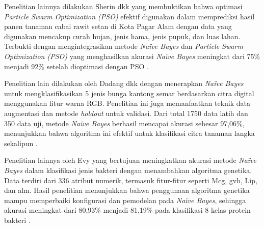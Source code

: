 Penelitian lainnya dilakukan Sherin dkk yang membuktikan bahwa optimasi \textit{Particle Swarm Optimization (PSO)} efektif digunakan dalam memprediksi hasil panen tanaman cabai rawit setan di Kota Pagar Alam dengan data yang digunakan mencakup curah hujan, jenis hama, jenis pupuk, dan luas lahan. Terbukti dengan mengintegrasikan metode \textit{Naïve Bayes} dan \textit{Particle Swarm Optimization (PSO)} yang menghasilkan akurasi \textit{Naïve Bayes} meningkat dari 75\% menjadi 92\% setelah dioptimasi dengan PSO \cite{junisthia2023integrasi}.

Penelitian lain dilakukan oleh Dadang dkk dengan menerapkan \textit{Naïve Bayes} untuk mengklasifikasikan 5 jenis bunga kantong semar berdasarkan citra digital menggunakan fitur warna RGB. Penelitian ini juga memanfaatkan teknik data augmentasi dan metode \textit{holdout} untuk validasi. Dari total 1750 data latih dan 350 data uji, metode \textit{Naïve Bayes} berhasil mencapai akurasi sebesar 97,06\%, menunjukkan bahwa algoritma ini efektif untuk klasifikasi citra tanaman langka sekalipun \cite{mulyana2022optimasi}.

Penelitian lainnya oleh Evy yang bertujuan meningkatkan akurasi metode \textit{Naïve Bayes} dalam klasifikasi jenis bakteri dengan menambahkan algoritma genetika. Data terdiri dari 336 atribut numerik, termasuk fitur-fitur seperti Mcg, gvh, Lip, dan alm. Hasil penelitian menunjukkan bahwa penggunaan algoritma genetika mampu memperbaiki konfigurasi dan pemodelan pada \textit{Naïve Bayes}, sehingga akurasi meningkat dari 80,93\% menjadi 81,19\% pada klasifikasi 8 kelas protein bakteri \cite{10.31294/swabumi.v9i2.11217}.




